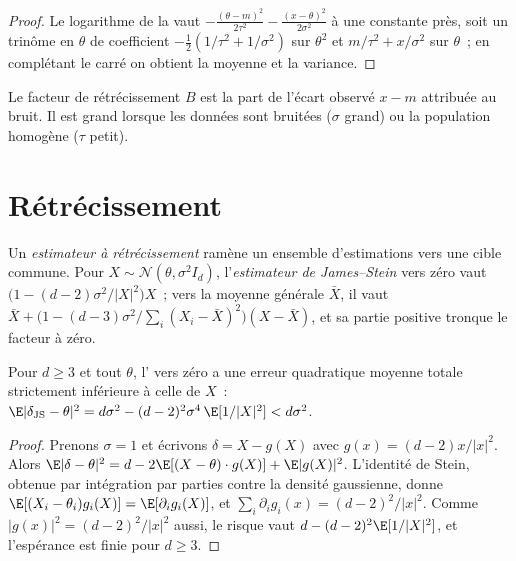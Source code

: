 \begin{proof}
Le logarithme de la  vaut $-\frac{(\theta - m)^2}{2\tau^2} - \frac{(x - \theta)^2}{2\sigma^2}$ à une constante près, soit un trinôme en $\theta$ de
coefficient $-\frac12(1/\tau^2 + 1/\sigma^2)$ sur $\theta^2$ et $m/\tau^2 + x/\sigma^2$ sur $\theta$~; en complétant le carré on obtient la moyenne
et la variance.
\end{proof}

Le facteur de rétrécissement $B$ est la part de l'écart observé $x - m$ attribuée au bruit. Il est grand lorsque les données sont bruitées
($\sigma$ grand) ou la population homogène ($\tau$ petit).

\section{Rétrécissement}

\begin{definition}\label{def:qm:bayesian-methods:js}
Un \emph{estimateur à rétrécissement} ramène un ensemble d'estimations vers une cible commune. Pour $X \sim \mathcal N(\theta,
\sigma^2I_d)$, l'\emph{estimateur de James--Stein} vers zéro vaut $\bigl(1 - (d - 2)\sigma^2/\lvert X\rvert^2\bigr)X$~;
vers la moyenne générale $\bar X$, il vaut $\bar X + \bigl(1 - (d - 3)\sigma^2/\sum_i(X_i - \bar X)^2\bigr)(X - \bar X)$, et sa partie positive
tronque le facteur à zéro.
\end{definition}

\begin{theorem}\label{thm:qm:bayesian-methods:js}
Pour $d \ge 3$ et tout $\theta$, l' vers zéro a une erreur quadratique moyenne totale strictement inférieure à celle de $X$~:
$\E\lvert\delta_{\mathrm{JS}} - \theta\rvert^2 = d\sigma^2 - (d - 2)^2\sigma^4\,\E[1/\lvert X\rvert^2] < d\sigma^2$.
\end{theorem}

\begin{proof}
Prenons $\sigma = 1$ et écrivons $\delta = X - g(X)$ avec $g(x) = (d - 2)x/\lvert x\rvert^2$. Alors $\E\lvert\delta - \theta\rvert^2 = d -
2\E[(X - \theta)\cdot g(X)] + \E\lvert g(X)\rvert^2$. L'identité de Stein, obtenue par intégration par parties contre la densité gaussienne, donne
$\E[(X_i - \theta_i)g_i(X)] = \E[\partial_ig_i(X)]$, et $\sum_i\partial_ig_i(x) = (d - 2)^2/\lvert x\rvert^2$. Comme $\lvert g(x)\rvert^2 = (d
- 2)^2/\lvert x\rvert^2$ aussi, le risque vaut $d - (d - 2)^2\E[1/\lvert X\rvert^2]$, et l'espérance est finie pour $d \ge 3$.
\end{proof}

